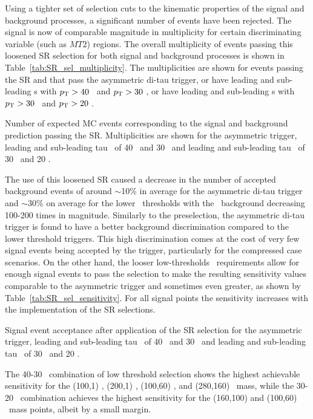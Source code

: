 	\SRTTTrigger
 	 Using a tighter set of selection cuts to the kinematic properties of the signal and background processes, a significant number of events have been rejected. The signal is now of comparable magnitude in multiplicity for certain discriminating variable (such as $MT2$) regions.
 	 The overall multiplicity of events passing this loosened \ac{SR} selection for both signal and background processes is shown in Table~\ref{tab:SR_sel_multiplicity}. The multiplicities are shown for events passing the \ac{SR} and that pass the asymmetric di-tau trigger, or have leading and sub-leading \ltau s with $p_{\mathrm{T}} > 40$ \gev\ and $p_{\mathrm{T}} > 30$ \gev, or have leading and sub-leading \ltau s with $p_{\mathrm{T}} > 30$ \gev\ and $p_{\mathrm{T}} > 20$ \gev. 
 	  \begin{table}[!hbt]
	\centering
	\caption{Number of expected \ac{MC} events corresponding to the signal and background prediction passing the \ac{SR}. Multiplicities are shown for the asymmetric trigger, leading and sub-leading tau \pt\ of 40 \gev\ and 30 \gev\, and leading and sub-leading tau \pt\ of 30 \gev\ and 20 \gev.}
		
	\label{tab:SR_sel_multiplicity}
	\end{table}
 	The use of this loosened \ac{SR} caused a decrease in the number of accepted background events of around $\sim$10\% in average for the asymmetric di-tau trigger and $\sim$30\% on average for the lower \pt\ thresholds with the \Zjets\ background decreasing 100-200 times in magnitude.
 	Similarly to the preselection, the asymmetric di-tau trigger is found to have a better background discrimination compared to the lower threshold triggers. 
 	This high discrimination comes at the cost of very few signal events being accepted by the trigger, particularly for the compressed case scenarios. 
 	On the other hand, the looser low-thresholds \pt\ requirements allow for enough signal events to pass the selection to make the resulting sensitivity values comparable to the asymmetric trigger and sometimes even greater, as shown by Table~\ref{tab:SR_sel_sensitivity}. 
 	For all signal points the sensitivity increases with the implementation of the \ac{SR} selections. 
 	 \begin{table}[!hbt]
	\centering
	\caption{Signal event acceptance after application of the \ac{SR} selection for the asymmetric trigger, leading and sub-leading tau \pt\ of 40 \gev\ and 30 \gev\, and leading and sub-leading tau \pt\ of 30 \gev\ and 20 \gev.}
		
	\label{tab:SR_sel_sensitivity}
	\end{table}
 	The 40-30 \gev\ combination of low threshold selection shows the highest achievable sensitivity for the (100,1) \gev, (200,1) \gev, (100,60) \gev, and (280,160) \gev\ mass, while the 30-20 \gev\ combination achieves the highest sensitivity for the (160,100) \gev and (100,60) \gev\ mass points, albeit by a small margin. 
 	
